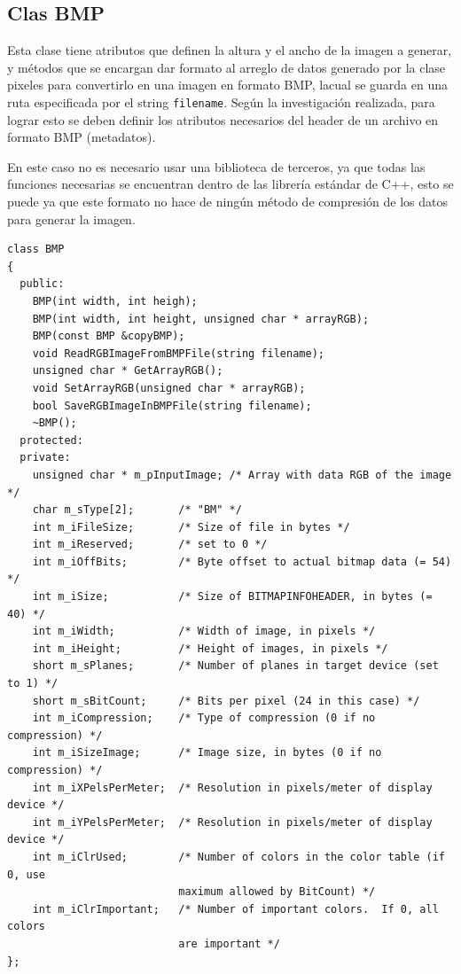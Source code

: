 \subsection{Clas BMP} 

Esta clase tiene atributos que definen la altura y el ancho de la imagen a generar, y métodos que se encargan dar formato al arreglo de datos generado por la clase pixeles para convertirlo en una imagen en formato BMP, lacual se guarda en una ruta especificada por el string \texttt{filename}. Según la investigación realizada, para lograr esto se deben definir los atributos necesarios del header de un archivo en formato BMP (metadatos).

En este caso no es necesario usar una biblioteca de terceros, ya que todas las funciones necesarias se encuentran dentro de las librería estándar de C++, esto se puede ya que este formato no hace de ningún método de compresión de los datos para generar la imagen. 

\begin{verbatim}
class BMP
{
  public:
    BMP(int width, int heigh);
    BMP(int width, int height, unsigned char * arrayRGB);
    BMP(const BMP &copyBMP);
    void ReadRGBImageFromBMPFile(string filename);
    unsigned char * GetArrayRGB();
    void SetArrayRGB(unsigned char * arrayRGB);
    bool SaveRGBImageInBMPFile(string filename);
    ~BMP();
  protected:
  private:
    unsigned char * m_pInputImage; /* Array with data RGB of the image */
    char m_sType[2];       /* "BM" */
    int m_iFileSize;       /* Size of file in bytes */
    int m_iReserved;       /* set to 0 */
    int m_iOffBits;        /* Byte offset to actual bitmap data (= 54) */
    int m_iSize;           /* Size of BITMAPINFOHEADER, in bytes (= 40) */
    int m_iWidth;          /* Width of image, in pixels */
    int m_iHeight;         /* Height of images, in pixels */
    short m_sPlanes;       /* Number of planes in target device (set to 1) */
    short m_sBitCount;     /* Bits per pixel (24 in this case) */
    int m_iCompression;    /* Type of compression (0 if no compression) */
    int m_iSizeImage;      /* Image size, in bytes (0 if no compression) */
    int m_iXPelsPerMeter;  /* Resolution in pixels/meter of display device */
    int m_iYPelsPerMeter;  /* Resolution in pixels/meter of display device */
    int m_iClrUsed;        /* Number of colors in the color table (if 0, use
                           maximum allowed by BitCount) */
    int m_iClrImportant;   /* Number of important colors.  If 0, all colors
                           are important */
};
\end{verbatim}

